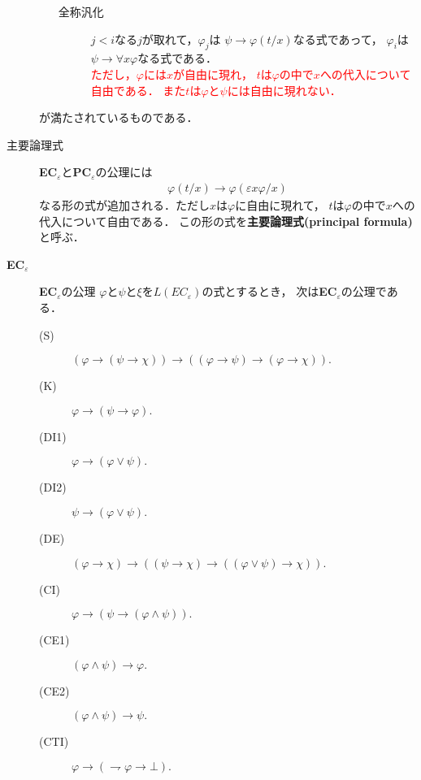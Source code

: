 \begin{description}
\begin{itemize}
\begin{description}
			\item[全称汎化] 
				$j < i$なる$j$が取れて，$\varphi_{j}$は
				$\psi \rightarrow \varphi(t/x)$なる式であって，
				$\varphi_{i}$は$\psi \rightarrow \forall x \varphi$なる式である．
				\\ \textcolor{red}{ただし，$\varphi$には$x$が自由に現れ，
				$t$は$\varphi$の中で$x$への代入について自由である．
				また$t$は$\varphi$と$\psi$には自由に現れない．}
		\end{description} 
	\end{itemize}
	が満たされているものである．
	
	\item[主要論理式]
	{\bf EC}${}_{\varepsilon}$と{\bf PC}${}_{\varepsilon}$の公理には
	\begin{align}
		\varphi(t/x) \rightarrow \varphi(\varepsilon x \varphi/x)
	\end{align}
	なる形の式が追加される．ただし$x$は$\varphi$に自由に現れて，
	$t$は$\varphi$の中で$x$への代入について自由である．
	この形の式を{\bf 主要論理式}{\bf (principal formula)}と呼ぶ．
	
	\item[{\bf EC}${}_{\varepsilon}$]\mbox{}
	
	\begin{itembox}[l]{{\bf EC}${}_{\varepsilon}$の公理}
		$\varphi$と$\psi$と$\xi$を$L(EC_{\varepsilon})$の式とするとき，
		次は{\bf EC}${}_{\varepsilon}$の公理である．
		\begin{description}
			\item[(S)] $(\varphi \rightarrow (\psi \rightarrow \chi)) 
				\rightarrow ((\varphi \rightarrow \psi)
				\rightarrow (\varphi \rightarrow \chi)).$
			\item[(K)] $\varphi \rightarrow (\psi \rightarrow \varphi).$
			\item[(DI1)] $\varphi \rightarrow (\varphi \vee \psi).$
			\item[(DI2)] $\psi \rightarrow (\varphi \vee \psi).$
			\item[(DE)] $(\varphi \rightarrow \chi) \rightarrow 
				((\psi \rightarrow \chi) \rightarrow ((\varphi \vee \psi) \rightarrow \chi)).$
			\item[(CI)] $\varphi \rightarrow (\psi \rightarrow (\varphi \wedge \psi)).$
			\item[(CE1)] $(\varphi \wedge \psi) \rightarrow \varphi.$
			\item[(CE2)] $(\varphi \wedge \psi) \rightarrow \psi.$
				
			\item[(CTI)] $\varphi \rightarrow (\rightharpoondown \varphi \rightarrow \bot).$
			

\end{description}
\end{itembox}
\end{description}
